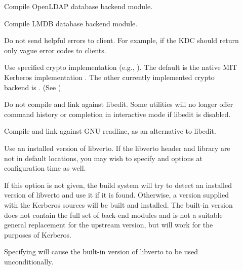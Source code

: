 \documentclass[letterpaper,10pt,english]{sphinxmanual}
\begin{document}
\begin{description}
\item[{\sphinxstylestrong{-}}] \leavevmode
Compile OpenLDAP database backend module.

\item[{\sphinxstylestrong{-}}] \leavevmode
Compile LMDB database backend module.

\item[{\sphinxstylestrong{-}}] \leavevmode
Do not send helpful errors to client.  For example, if the KDC
should return only vague error codes to clients.

\item[{\sphinxstylestrong{-}}] \leavevmode
Use specified crypto implementation (e.g., \sphinxstylestrong{-}).  The default is the native MIT
Kerberos implementation .  The other currently
implemented crypto backend is .  (See
)

\item[{\sphinxstylestrong{-}}] \leavevmode
Do not compile and link against libedit.  Some utilities will no
longer offer command history or completion in interactive mode if
libedit is disabled.

\item[{\sphinxstylestrong{-}}] \leavevmode
Compile and link against GNU readline, as an alternative to libedit.

\item[{\sphinxstylestrong{-}}] \leavevmode
Use an installed version of libverto.  If the libverto header and
library are not in default locations, you may wish to specify
 and  options
at configuration time as well.

If this option is not given, the build system will try to detect
an installed version of libverto and use it if it is found.
Otherwise, a version supplied with the Kerberos sources will be
built and installed.  The built-in version does not contain the
full set of back-end modules and is not a suitable general
replacement for the upstream version, but will work for the
purposes of Kerberos.

Specifying \sphinxstylestrong{-} will cause the built-in
version of libverto to be used unconditionally.


\end{description}
\end{document}
